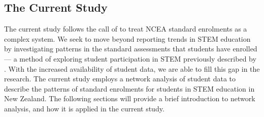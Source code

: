 \documentclass[a4paper]{article}
\begin{document}

\subsection{The Current Study}
The current study follows the call of \cite{hipkins2016ncea} to treat NCEA standard enrolments as a complex system. We seek to move beyond reporting trends in STEM education by investigating patterns in the standard assessments that students have enrolled --- a method of exploring student participation in STEM previously described by \cite{hipkins2005staying}. With the increased availability of student data, we are able to fill this gap in the research. The current study employs a network analysis of student data to describe the patterns of standard enrolments for students in STEM education in New Zealand. The following sections will provide a brief introduction to network analysis, and how it is applied in the current study. 
\end{document}
